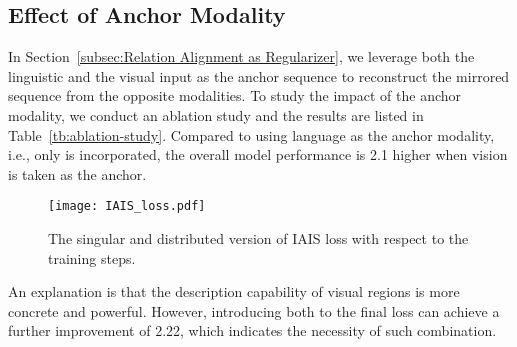 \documentclass[11pt,a4paper]{article}
\begin{document}
\subsection{Effect of Anchor Modality}
In Section~\ref{subsec:Relation Alignment as Regularizer}, we leverage both the linguistic and the visual input as the anchor sequence to reconstruct the mirrored sequence from the opposite modalities. 
To study the impact of the anchor modality, we conduct an ablation study and the results are listed in Table~\ref{tb:ablation-study}. 
Compared to using language as the anchor modality, i.e., only  is incorporated, the overall model performance is 2.1 higher when vision is taken as the anchor. \begin{figure}[t]
    \centering
    \texttt{[image: IAIS\_loss.pdf]}
    \caption{The singular and distributed version of IAIS loss with respect to the training steps.}
    \label{fig:IAIS-loss}
\end{figure}
An explanation is that the description capability of visual regions is more concrete and powerful. 
However, introducing both  to the final loss can achieve a further improvement of 2.22, which indicates the necessity of such combination.
\end{document}
